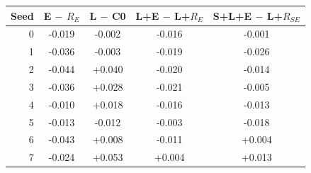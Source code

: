 \begin{tabular}{@{}rcccc@{}}
\toprule
Seed & E $-$ $R_E$ & L $-$ C0 & L+E $-$ L+$R_E$ & S+L+E $-$ L+$R_{SE}$\\
\midrule
0 & -0.019 & -0.002 & -0.016 & -0.001\\
1 & -0.036 & -0.003 & -0.019 & -0.026\\
2 & -0.044 & +0.040 & -0.020 & -0.014\\
3 & -0.036 & +0.028 & -0.021 & -0.005\\
4 & -0.010 & +0.018 & -0.016 & -0.013\\
5 & -0.013 & -0.012 & -0.003 & -0.018\\
6 & -0.043 & +0.008 & -0.011 & +0.004\\
7 & -0.024 & +0.053 & +0.004 & +0.013\\
\bottomrule
\end{tabular}
